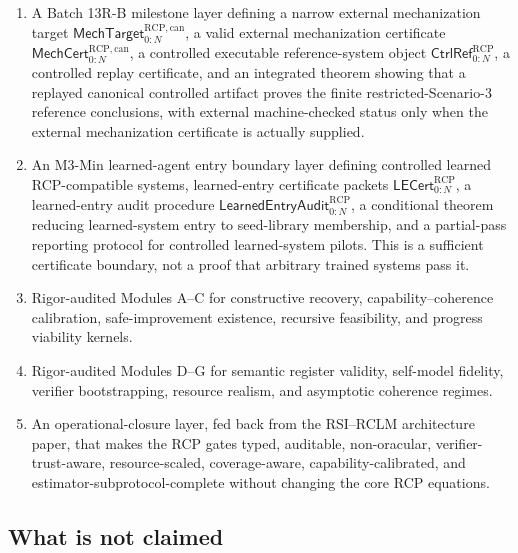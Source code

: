 \documentclass[11pt]{article}
\newcommand{\1}{\mathbf{1}}
\newcommand{\RCP}{\mathrm{RCP}}
\begin{document}
\begin{enumerate}[label=(\roman*)]
    \item A Batch 13R-B milestone layer defining a narrow external mechanization target \(\mathsf{MechTarget}_{0:N}^{\RCP,\mathrm{can}}\), a valid external mechanization certificate \(\mathsf{MechCert}_{0:N}^{\RCP,\mathrm{can}}\), a controlled executable reference-system object \(\mathsf{CtrlRef}_{0:N}^{\RCP}\), a controlled replay certificate, and an integrated theorem showing that a replayed canonical controlled artifact proves the finite restricted-Scenario-3 reference conclusions, with external machine-checked status only when the external mechanization certificate is actually supplied.
    \item An M3-Min learned-agent entry boundary layer defining controlled learned RCP-compatible systems, learned-entry certificate packets \(\mathsf{LECert}_{0:N}^{\RCP}\), a learned-entry audit procedure \(\mathsf{LearnedEntryAudit}_{0:N}^{\RCP}\), a conditional theorem reducing learned-system entry to seed-library membership, and a partial-pass reporting protocol for controlled learned-system pilots. This is a sufficient certificate boundary, not a proof that arbitrary trained systems pass it.
    \item Rigor-audited Modules A--C for constructive recovery, capability--coherence calibration, safe-improvement existence, recursive feasibility, and progress viability kernels.
    \item Rigor-audited Modules D--G for semantic register validity, self-model fidelity, verifier bootstrapping, resource realism, and asymptotic coherence regimes.
    \item An operational-closure layer, fed back from the RSI--RCLM architecture paper, that makes the RCP gates typed, auditable, non-oracular, verifier-trust-aware, resource-scaled, coverage-aware, capability-calibrated, and estimator-subprotocol-complete without changing the core RCP equations.
\end{enumerate}

\subsection{What is not claimed}
\end{document}
